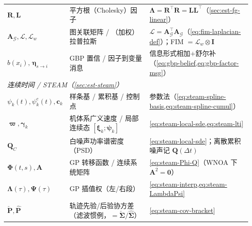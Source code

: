 \begin{table}[H]
\begin{tabular}{lll}
$\mathbf{R},\mathbf{L}$ & 平方根（Cholesky）因子 & $\boldsymbol{\Lambda}=\mathbf{R}^\top\mathbf{R}=\mathbf{L}\mathbf{L}^\top$（\cref{sec:est-fg-linear}） \\
$\mathbf{A}_{\mathcal{G}},\boldsymbol{\mathcal{L}},\boldsymbol{\mathcal{L}}_w$ & 图关联矩阵 / （加权）拉普拉斯 & $\boldsymbol{\mathcal{L}}=\mathbf{A}_{\mathcal{G}}^\top\mathbf{A}_{\mathcal{G}}$（\cref{eq:fim-laplacian-def}）；FIM $=\boldsymbol{\mathcal{L}}_w\otimes\mathbf{I}$ \\
$b(x_i),\,\boldsymbol{\eta}_{s\to i}$ & GBP 置信 / 因子到变量消息 & 信息形式相加$+$舒尔补（\cref{eq:gbp-belief,eq:gbp-factor-msg}） \\
\multicolumn{3}{l}{\emph{连续时间 / STEAM（\cref{sec:est-steam}）}} \\
$\psi_k(t),\psi_k^c(t),\mathbf{c}_k$ & 样条基 / 累积基 / 控制点 & 参数法（\cref{eq:steam-spline-basis,eq:steam-spline-cumul}） \\
$\boldsymbol{\varpi},\boldsymbol{\gamma}_k$ & 机体系广义速度 / 局部连续态 $[\boldsymbol{\xi}_k;\boldsymbol{\psi}_k]$ & \cref{eq:steam-local-sde,eq:steam-lti} \\
$\mathbf{Q}_C$ & 白噪声功率谱密度（PSD） & \cref{eq:steam-local-sde}；离散累积噪声记 $\mathbf{Q}(\Delta t)$ \\
$\boldsymbol{\Phi}(t,s),\mathbf{A}$ & GP 转移函数 / 连续系统矩阵 & \cref{eq:steam-Phi-Q}（WNOA 下 $\mathbf{A}^2=\mathbf{0}$） \\
$\boldsymbol{\Lambda}(\tau),\boldsymbol{\Psi}(\tau)$ & GP 插值权（左/右段） & \cref{eq:steam-interp,eq:steam-LambdaPsi} \\
$\check{\mathbf{P}},\hat{\mathbf{P}}$ & 轨迹先验/后验协方差（滤波惯例，$=\check{\boldsymbol{\Sigma}}/\hat{\boldsymbol{\Sigma}}$） & \cref{eq:steam-cov-bracket} \\
\bottomrule
\end{tabular}
\end{table}

